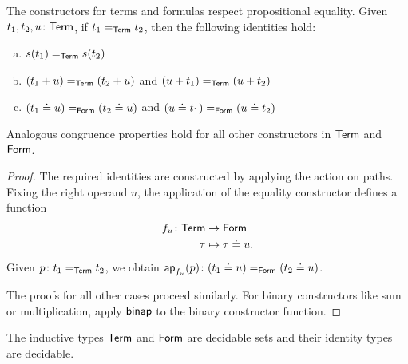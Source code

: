\begin{lem}
    \label{lem:constructor-congruence}
    The constructors for terms and formulas respect propositional equality. Given\/ $t_1,t_2,u\colon\fun{Term}$, if\/ $t_1\mathrel{=_{\mathsf{Term}}}t_2$, then the following identities hold:
    \begin{enumerate}[a),font=\upshape]
        \item $s(t_1)\mathrel{=_{\mathsf{Term}}}s(t_2)$
        
        \item $(t_1+u)\mathrel{=_{\mathsf{Term}}}(t_2+u)$ and\/ $(u+t_1)\mathrel{=_{\mathsf{Term}}}(u+t_2)$
        
        \item $(t_1\doteq u)\mathrel{=_{\mathsf{Form}}}(t_2\doteq u)$ and\/ $(u\doteq t_1)\mathrel{=_{\mathsf{Form}}}(u\doteq t_2)$
    \end{enumerate}
    Analogous congruence properties hold for all other constructors in\/ $\mathsf{Term}$ and\/ $\mathsf{Form}$.
\end{lem}

\begin{proof}
    The required identities are constructed by applying the action on paths. Fixing the right operand $u$, the application of the equality constructor defines a function
    \begin{align*}
        f_u\colon\fun{Term}&\to\fun{Form}\\
        \tau&\mapsto\tau\doteq u.
    \end{align*}
    Given $p\colon t_1\eq{\fun{Term}}t_2$, we obtain $\fun{ap}_{f_u}(p)\colon(t_1\doteq u)\eq{\fun{Form}}(t_2\doteq u)$.
    
    The proofs for all other cases proceed similarly. For binary constructors like sum or multiplication, apply $\mathsf{binap}$ to the binary constructor function.
\end{proof}

\begin{thm}\label{thm:syntax-are-sets}
    The inductive types\/ $\mathsf{Term}$ and\/ $\mathsf{Form}$ are decidable sets and their identity types are decidable.
\end{thm}

